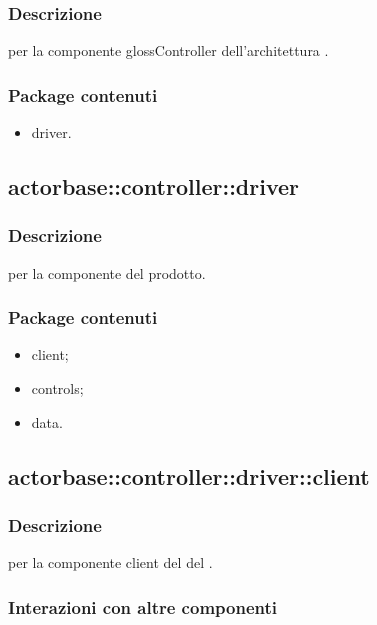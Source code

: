 \documentclass{scalatekids-article}
\begin{document}
\subsubsection{Descrizione}

 per la componente gloss{Controller} dell'architettura
.

\subsubsection{Package contenuti}

\begin{itemize}
\item driver.
\end{itemize}

\subsection{actorbase::controller::driver}

\subsubsection{Descrizione}

 per la componente  del prodotto.

\subsubsection{Package contenuti}

\begin{itemize}
\item client;
\item controls;
\item data.
\end{itemize}

\subsection{actorbase::controller::driver::client}

\subsubsection{Descrizione}

 per la componente client del  del
.

\subsubsection{Interazioni con altre componenti}
\end{document}
